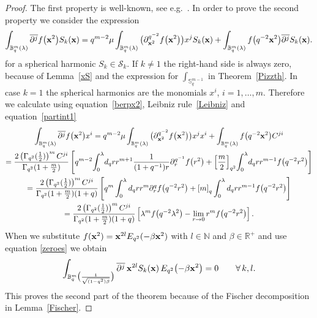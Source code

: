 \documentclass[pdftex]{sigma}
\newcommand{\mR}{\mathbb{R}}
\newcommand{\mN}{\mathbb{N}}
\newcommand{\mS}{\mathbb{S}}
\newcommand{\mB}{\mathbb{B}}
\newcommand{\cS}{\mathcal{S}}
\numberwithin{equation}{section}
\begin{document}
\begin{proof}
The f\/irst property is well-known, see e.g.~\cite{MR1239953, MR1408120}. In order to prove the second property we consider the expression
\begin{gather*}
\int_{\mB^m_q(\lambda)}\overline{\partial^j}f\big(\bold{x}^2\big)S_k(\bold{x})
=q^{m-2}\mu\int_{\mB^m_q(\lambda)}\big(\partial_{\bold{x}^2}^{q^{-2}}f\big(\bold{x}^2\big)\big)x^j S_k(\bold{x})+\int_{\mB^m_q(\lambda)}f\big(q^{-2}\bold{x}^2\big)\overline{\partial^j}S_k(\bold{x}).
\end{gather*}
for a spherical harmonic $S_k\in\cS_k$. If $k\not=1$ the right-hand side is always zero, because of Lemma~\ref{xS} and the expression for $\int_{\mS^{m-1}_q}$ in Theorem~\ref{Pizzth}. In case $k=1$ the spherical harmonics are the monomials $x^i$, $i=1,\dots,m$. Therefore we calculate using equation~\eqref{berpx2}, Leibniz rule~\eqref{Leibniz} and equation~\eqref{partint1}
\begin{gather*}
\int_{\mB^m_q(\lambda)}\overline{\partial^j}f\big(\bold{x}^2\big)x^i
=q^{m-2}\mu\int_{\mB^m_q(\lambda)}\big(\partial_{\bold{x}^2}^{q^{-2}}f\big(\bold{x}^2\big)\big)x^j x^i+\int_{\mB^m_q(\lambda)}f\big(q^{-2}\bold{x}^2\big)C^{ji}\\
=\frac{2\left(\Gamma_{q^2}(\frac{1}{2})\right)^{m}C^{ji}}{\Gamma_{q^2}(1+\frac{m}{2})}\left[q^{m-2}\!\int_0^\lambda \!d_qr r^{m+1}\frac{1}{(1+q^{-1})r}\partial^{q^{-1}}_rf\big(r^2\big)+\left[\frac{m}{2}\right]_{q^2}\!\int_0^\lambda \! d_qr r^{m-1}f\big(q^{-2}r^2\big)\right]\\
=\frac{2\left(\Gamma_{q^2}(\frac{1}{2})\right)^{m}C^{ji}}{\Gamma_{q^2}(1+\frac{m}{2})(1+q)}\left[q^{m}\int_0^\lambda d_qr r^{m}\partial^q_rf\big(q^{-2}r^2\big)+\left[m\right]_q\int_0^\lambda d_qr r^{m-1}f\big(q^{-2}r^2\big)\right]\\
=\frac{2\left(\Gamma_{q^2}(\frac{1}{2})\right)^{m}C^{ji}}{\Gamma_{q^2}(1+\frac{m}{2})(1+q)}\left[\lambda^mf\big(q^{-2}\lambda^2\big)-\lim_{r\to0}r^m f\big(q^{-2}r^2\big)\right].
\end{gather*}
When we substitute $f(\bold{x}^2)=\bold{x}^{2l}E_{q^2}(-\beta \bold{x}^2)$ with $l\in\mN$ and $\beta\in\mR^+$ and use equation \eqref{zeroes} we obtain
\begin{gather*}
\int_{\mB^m_q\big(\frac{1}{\sqrt{(1-q^2)\beta}}\big)}\overline{\partial^j}\,\bold{x}^{2l}S_k(\bold{x})\,E_{q^2}\big({-}\beta \bold{x}^2\big) = 0\qquad \forall\, k,l.
\end{gather*}
This proves the second part of the theorem because of the Fischer decomposition in Lem\-ma~\ref{Fischer}.
\end{proof}
\end{document}
